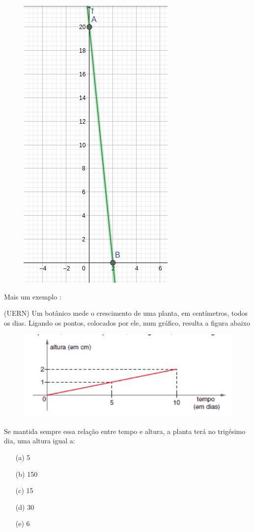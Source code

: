 \begin{multicols*}{2}
\begin{enumerate}[wide, labelwidth=!, labelindent=0pt]
              \begin{figure}[H]
                  \centering
                  \includegraphics[scale=0.3]{assets/rafael/img13.png}
              \end{figure}
    \end{enumerate}

    Mais um exemplo :

    (UERN) Um botânico mede o crescimento de uma planta, em centímetros, todos os dias. Ligando os 			pontos, colocados por ele, num gráfico, resulta a figura abaixo
    \begin{figure}[H]
        \centering
        \includegraphics[scale=0.4]{assets/rafael/img15.png}
    \end{figure}
    Se mantida sempre essa relação entre tempo e altura, a planta terá no trigésimo dia, uma altura 		igual a:
    \begin{enumerate}
        \item[(a)] 5
        \item[(b)] 150
        \item[(c)] 15
        \item[(d)] 30
        \item[(e)] 6
    \end{enumerate}


\end{multicols*}
